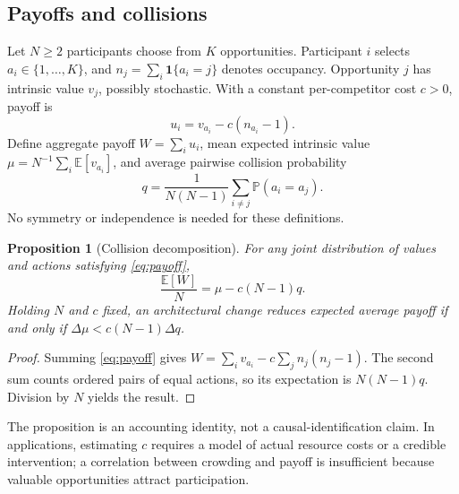 \documentclass[11pt,a4paper]{article}
\newtheorem{proposition}[theorem]{Proposition}
\theoremstyle{definition}
\theoremstyle{remark}
\newcommand{\E}{\mathbb E}
\newcommand{\Prb}{\mathbb P}
\newcommand{\ind}{\mathbf 1}
\begin{document}
\subsection{Payoffs and collisions}
Let $N\geq 2$ participants choose from $K$ opportunities. Participant $i$ selects $a_i\in\{1,\ldots,K\}$, and $n_j=\sum_i\ind\{a_i=j\}$ denotes occupancy. Opportunity $j$ has intrinsic value $v_j$, possibly stochastic. With a constant per-competitor cost $c>0$, payoff is
\begin{equation}\label{eq:payoff}
 u_i=v_{a_i}-c(n_{a_i}-1).
\end{equation}
Define aggregate payoff $W=\sum_i u_i$, mean expected intrinsic value
$\mu=N^{-1}\sum_i\E[v_{a_i}]$, and average pairwise collision probability
\begin{equation}
 q=\frac{1}{N(N-1)}\sum_{i\ne j}\Prb(a_i=a_j).
\end{equation}
No symmetry or independence is needed for these definitions.
\begin{proposition}[Collision decomposition]\label{prop:decomp}
For any joint distribution of values and actions satisfying \eqref{eq:payoff},
\begin{equation}\label{eq:decomp}
 \frac{\E[W]}{N}=\mu-c(N-1)q.
\end{equation}
Holding $N$ and $c$ fixed, an architectural change reduces expected average payoff if and only if $\Delta\mu<c(N-1)\Delta q$.
\end{proposition}
\begin{proof}
Summing \eqref{eq:payoff} gives $W=\sum_i v_{a_i}-c\sum_j n_j(n_j-1)$. The second sum counts ordered pairs of equal actions, so its expectation is $N(N-1)q$. Division by $N$ yields the result.
\end{proof}
The proposition is an accounting identity, not a causal-identification claim. In applications, estimating $c$ requires a model of actual resource costs or a credible intervention; a correlation between crowding and payoff is insufficient because valuable opportunities attract participation.
\end{document}
